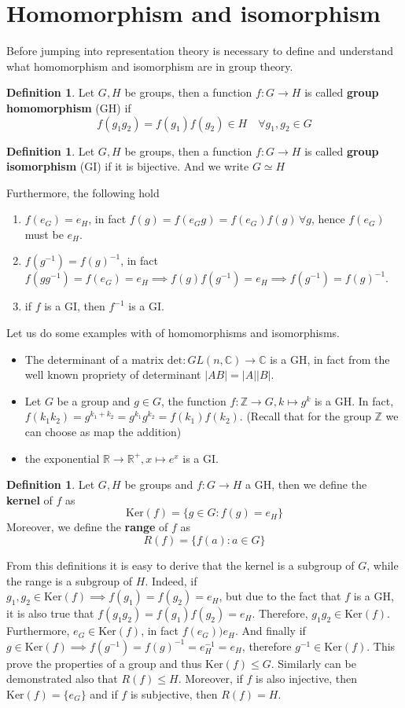 \documentclass[12pt]{book}
\theoremstyle{plain}
\newcommand{\R}{\mathbb{R}}
\newcommand{\Z}{\mathbb{Z}}
\newcommand{\C}{\mathbb{C}}
\theoremstyle{definition}
\newtheorem{dfn}[thm]{Definition}
\theoremstyle{remark}
\begin{document}
\section{Homomorphism and isomorphism}
Before jumping into representation theory is necessary to define and understand what homomorphism and isomorphism are in group theory.
\begin{dfn}
Let $G,H$ be groups, then a function $f:G\to H$ is called \textbf{group homomorphism} (GH) if
\[f(g_1g_2) = f(g_1)f(g_2)\in H\quad \forall g_1,g_2\in G\]
\end{dfn}
\begin{dfn}
Let $G,H$ be groups, then a function $f:G\to H$ is called \textbf{group isomorphism} (GI) if it is bijective. And we write $G\simeq H$
\end{dfn}
Furthermore, the following hold
\begin{enumerate}
	\item $f(e_G) = e_H$, in fact $f(g) = f(e_Gg)=f(e_G)f(g)\,\forall g$, hence $f(e_G)$ must be $e_H$.
	\item $f(g^{-1}) = f(g)^{-1}$, in fact $f(gg^{-1})=f(e_G) = e_H \implies f(g)f(g^{-1}) = e_H \implies f(g^{-1}) = f(g)^{-1}$.
	\item if $f$ is a GI, then $f^{-1}$ is a GI.
\end{enumerate}
Let us do some examples with of homomorphisms and isomorphisms.
\begin{itemize}
\item The determinant of a matrix $\text{det}:GL(n,\C) \to \C$ is a GH, in fact from the well known propriety of determinant $|AB| = |A||B|$.
\item Let $G$ be a group and $g\in G$, the function $f:\Z \to G,k\mapsto g^k$ is a GH. In fact, $f(k_1k_2) = g^{k_1+k_2} = g^{k_1}g^{k_2} = f(k_1)f(k_2)$. (Recall that for the group $\Z$ we can choose as map the addition)
\item the exponential $\R\to \R^+, x\mapsto e^x$ is a GI.
\end{itemize}
\begin{dfn}
Let $G,H$ be groups and $f:G\to H$ a GH, then we define the \textbf{kernel} of $f$ as
\[\text{Ker}(f) = \{g\in G:f(g)=e_H\}\]
Moreover, we define the \textbf{range} of $f$ as
\[R(f) = \{f(a):a\in G\}\]
\end{dfn}
From this definitions it is easy to derive that the kernel is a subgroup of $G$, while the range is a subgroup of $H$. Indeed, if $g_1,g_2\in \text{Ker}(f)\implies f(g_1)=f(g_2)=e_H$, but due to the fact that $f$ is a GH, it is also true that $f(g_1g_2) = f(g_1)f(g_2)=e_H$. Therefore, $g_1g_2\in \text{Ker}(f)$. Furthermore, $e_G\in \text{Ker}(f)$, in fact $f(e_G) ) e_H$. And finally if $g\in \text{Ker}(f)\implies f(g^{-1}) = f(g)^{-1} = e_H^{-1} = e_H$, therefore $g^{-1}\in\text{Ker}(f)$. This prove the properties of a group and thus $\text{Ker}(f)\leq G$. Similarly can be demonstrated also that $R(f)\leq H$. Moreover, if $f$ is also injective, then $\text{Ker}(f) = \{e_G\}$ and if $f$ is subjective, then $R(f) = H$. \\
\end{document}
